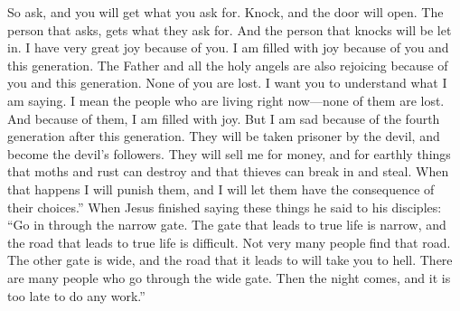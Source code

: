So ask, and you will get what you ask for. Knock, and the door will open. The person that asks, gets what they ask for. And the person that knocks will be let in.
\bverse \iffalse And now, behold, my joy is great, even unto fulness, because of you, and also this generation; yea, and even the Father rejoiceth, and also all the holy angels, because of you and this generation; for none of them are lost. \fi
I have very great joy because of you. I am filled with joy because of you and this generation. The Father and all the holy angels are also rejoicing because of you and this generation. None of you are lost.
\bverse \iffalse Behold, I would that ye should understand; for I mean them who are now alive of this generation; and none of them are lost; and in them I have fulness of joy. \fi
I want you to understand what I am saying. I mean the people who are living right now---none of them are lost. And because of them, I am filled with joy.
\bverse \iffalse But behold, it sorroweth me because of the fourth generation from this generation, for they are led away captive by him even as was the son of perdition; for they will sell me for silver and for gold, and for that which moth doth corrupt and which thieves can break through and steal. And in that day will I visit them, even in turning their works upon their own heads. \fi
But I am sad because of the fourth generation after this generation. They will be taken prisoner by the devil, and become the devil's followers. They will sell me for money, and for earthly things that moths and rust can destroy and that thieves can break in and steal. When that happens I will punish them, and I will let them have the consequence of their choices.''
\bverse \iffalse And it came to pass that when Jesus had ended these sayings he said unto his disciples: Enter ye in at the strait gate; for strait is the gate, and narrow is the way that leads to life, and few there be that find it; but wide is the gate, and broad the way which leads to death, and many there be that travel therein, until the night cometh, wherein no man can work. \fi
When Jesus finished saying these things he said to his disciples: ``Go in through the narrow gate. The gate that leads to true life is narrow, and the road that leads to true life is difficult. Not very many people find that road. The other gate is wide, and the road that it leads to will take you to hell. There are many people who go through the wide gate. Then the night comes, and it is too late to do any work.''
\bchapter
